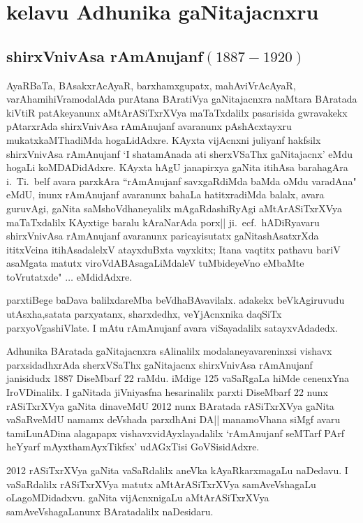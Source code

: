 \chapter{kelavu Adhunika gaNitajacnxru}

\section{{\protect\bf shirxVnivAsa rAmAnujanf$(1887-1920)$}}

AyaRBaTa, BAsakxrAcAyaR, barxhamxgupatx, mahAviVrAcAyaR, varAhamihiVra\break modalAda purAtana BAratiVya gaNitajacnxra naMtara BAratada kiVtiR patAkeyanunx aMtArASiTxrXVya maTaTxdalilx pasarisida gwravakekx pAtarxrAda shirxVnivAsa rAmAnujanf avaranunx pAshAcxtayxru mukatxkaMThadiMda hogaLidAdxre. KAyxta vijAcnxni juliyanf hakfsilx shirxVnivAsa rAmAnujanf `I shatamAnada ati sherxVSaThx gaNitajacnx' eMdu hogaLi koMDADidAdxre. KAyxta hAgU janapirxya gaNita itihAsa barahagAra i.~Ti.~belf avara parxkAra ``rAmAnujanf savxgaRdiMda baMda oMdu varadAna" eMdU, inunx rAmAnujanf avaranunx bahaLa hatitxradiMda balalx, avara guruvAgi, gaNita saMshoVdhaneyalilx mAgaRdashiRyAgi aMtArASiTxrXVya maTaTxdalilx KAyxtige baralu kAraNarAda porx|| ji.~ecf.~hADiRyavaru shirxVnivAsa rAmAnujanf avaranunx paricayisutatx gaNitashAsatxrXda ititxVcina itihAsadalelxV atayxduBxta vayxkitx; Itana vaqtitx pathavu bariV asaMgata matutx viroVdABAsagaLiMdaleV tuMbideyeVno eMbaMte toVrutatxde" $\ldots$ eMdidAdxre.

parxtiBege baDava balilxdareMba beVdhaBAvavilalx. adakekx beVkAgiruvudu utAsxha,\break satata parxyatanx, sharxdedhx, veYjAcnxnika daqSiTx parxyoVgashiVlate. I mAtu rAmAnujanf avara viSayadalilx satayxvAdadedx.

Adhunika BAratada gaNitajacnxra sAlinalilx modalaneyavareninxsi vishavx parxsidadhxrAda sherxVSaThx gaNitajacnx shirxVnivAsa rAmAnujanf janisidudx {\rm 1887} DiseMbarf {\rm 22} raMdu. iMdige {\rm 125} vaSaRgaLa hiMde cenenxYna IroVDinalilx. I gaNitada jiVniyasfna hesarinalilx parxti DiseM\-barf {\rm 22} nunx rASiTxrXVya gaNita dinaveMdU {\rm 2012} nunx BAratada rASiTxrXVya gaNita vaSaRveMdU namamx deVshada parxdhAni DA|| manamoVhana siMgf avaru tamiLunADina alagapapx vishavxvidAyxlayadalilx `rAmAnujanf seMTarf PArf heYyarf mAyxthamAyxTikfsx' udAGxTisi GoVSisidAdxre.

{\rm 2012} rASiTxrXVya gaNita vaSaRdalilx aneVka kAyaRkarxmagaLu naDedavu. I vaSaRdalilx rASiTxrXVya matutx aMtArASiTxrXVya samAveVshagaLu oLagoMDidadxvu. gaNita vijAcnxnigaLu aMtArASiTxrXVya samAveVshagaLanunx BAratadalilx naDesidaru.

